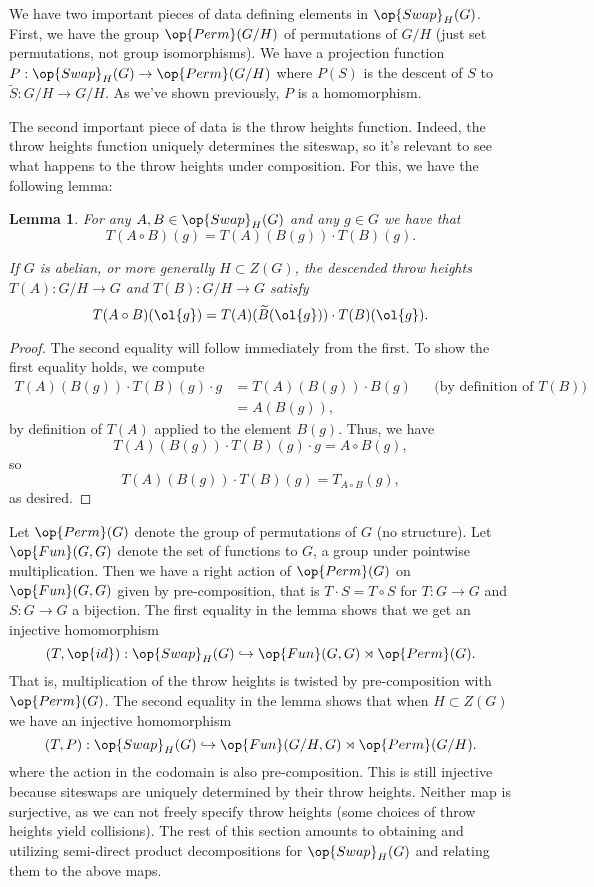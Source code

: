 \documentclass[12nt]{article}
\theoremstyle{plain}
\newtheorem{lemma}{Lemma}
\begin{document}
We have two important pieces of data defining elements in $\op{Swap}_H(G)$. First, we have the group $\op{Perm}(G/H)$ of permutations of $G/H$ (just set permutations, not group isomorphisms). We have a projection function $P : \op{Swap}_H(G) \to \op{Perm}(G/H)$ where $P(S)$ is the descent of $S$ to $\widetilde{S} : G/H \to G/H$. As we've shown previously, $P$ is a homomorphism.

The second important piece of data is the throw heights function. Indeed, the throw heights function uniquely determines the siteswap, so it's relevant to see what happens to the throw heights under composition. For this, we have the following lemma:

\begin{lemma}
For any $A, B \in \op{Swap}_H(G)$ and any $g \in G$ we have that
\[
T(A \circ B)(g) = T(A)(B(g)) \cdot T(B)(g).
\]

If $G$ is abelian, or more generally $H \subset Z(G)$, the descended throw heights $T(A) : G/H \to G$ and $T(B) : G/H \to G$ satisfy
\[
T(A \circ B)(\ol{g}) = T(A)(\widetilde{B}(\ol{g})) \cdot T(B)(\ol{g}).
\]

\end{lemma}

\begin{proof}
The second equality will follow immediately from the first. To show the first equality holds, we compute
\begin{align*}
T(A)(B(g))\cdot T(B)(g) \cdot g &= T(A)(B(g))\cdot B(g) && \text{(by definition of $T(B)$)} \\
	&= A(B(g)),
\end{align*} 
by definition of $T(A)$ applied to the element $B(g)$. Thus, we have
\[
T(A)(B(g))\cdot T(B)(g) \cdot g = A \circ B(g),
\]
so 
\[
T(A)(B(g)) \cdot T(B)(g) = T_{A \circ B}(g),
\]
as desired.
\end{proof}

Let $\op{Perm}(G)$ denote the group of permutations of $G$ (no structure). Let $\op{Fun}(G, G)$ denote the set of functions to $G$, a group under pointwise multiplication. Then we have a right action of $\op{Perm}(G)$ on $\op{Fun}(G, G)$ given  by pre-composition, that is $T \cdot S = T \circ S$ for $T : G \to G$ and $S : G \to G$ a bijection. The first equality in the lemma shows that we get an injective homomorphism
\[
(T, \op{id}) : \op{Swap}_H(G) \hookrightarrow \op{Fun}(G, G) \rtimes \op{Perm}(G).
\]
That is, multiplication of the throw heights is twisted by pre-composition with $\op{Perm}(G)$. The second equality in the lemma shows that when $H \subset Z(G)$ we have an injective homomorphism
\[
(T, P) : \op{Swap}_H(G) \hookrightarrow \op{Fun}(G/H, G) \rtimes \op{Perm}(G/H).
\]
where the action in the codomain is also pre-composition. This is still injective because siteswaps are uniquely determined by their throw heights. Neither map is surjective, as we can not freely specify throw heights (some choices of throw heights yield collisions). The rest of this section amounts to obtaining and utilizing semi-direct product decompositions for $\op{Swap}_H(G)$ and relating them to the above maps.
\end{document}
